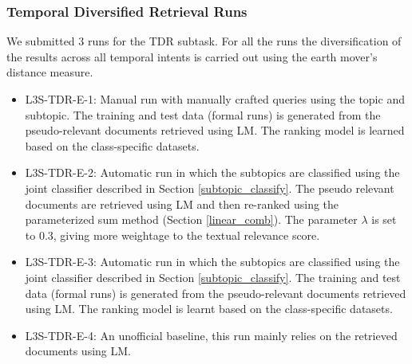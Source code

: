\documentclass{sig-alternate}
\begin{document}
\subsubsection{Temporal Diversified Retrieval Runs}
We submitted 3 runs for the TDR subtask. For all the runs the diversification of the results across all temporal intents is carried out using the earth mover's distance measure.
\begin{itemize}
\item \textsf{L3S-TDR-E-1}: Manual run with manually crafted queries using the topic and subtopic. The training and test data (formal runs) is generated from the pseudo-relevant documents retrieved using LM. The ranking model is learned based on the class-specific datasets.
\item \textsf{L3S-TDR-E-2}: Automatic run in which the subtopics are classified using the joint classifier described in Section \ref{subtopic_classify}. The pseudo relevant documents are retrieved using LM and then re-ranked using the parameterized sum method (Section \ref{linear_comb}). The parameter $\lambda$ is set to 0.3, giving more weightage to the textual relevance score.
\item \textsf{L3S-TDR-E-3}: Automatic run in which the subtopics are classified using the joint classifier described in Section \ref{subtopic_classify}. The training and test data (formal runs) is generated from the pseudo-relevant documents retrieved using LM. The ranking model is learnt based on the class-specific datasets.
\item \textsf{L3S-TDR-E-4}: An unofficial baseline, this run mainly relies on the retrieved documents using LM.
\end{itemize}
\end{document}
